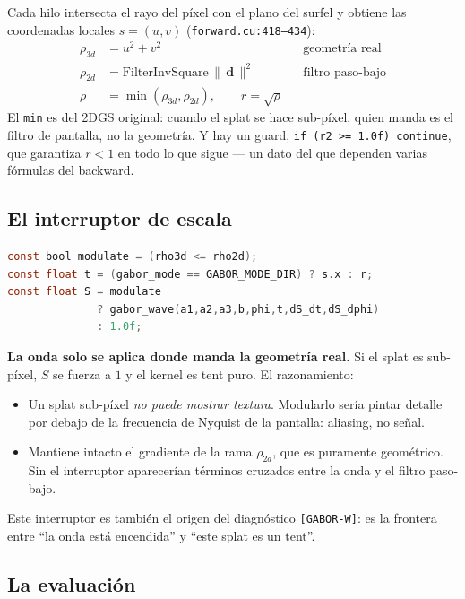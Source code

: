 \documentclass[12pt]{extarticle}
\newcommand{\code}[1]{\texttt{#1}}
\begin{document}
Cada hilo intersecta el rayo del píxel con el plano del surfel y obtiene las
coordenadas locales $s=(u,v)$ (\code{forward.cu:418--434}):
\begin{align}
\rho_{3d} &= u^2+v^2 && \text{geometría real} \\
\rho_{2d} &= \text{FilterInvSquare}\,\|\,\mathbf{d}\,\|^2 && \text{filtro paso-bajo} \\
\rho      &= \min(\rho_{3d},\rho_{2d}), \qquad r=\sqrt{\rho}
\end{align}
El \code{min} es del 2DGS original: cuando el splat se hace sub-píxel, quien
manda es el filtro de pantalla, no la geometría. Y hay un guard,
\code{if (r2 >= 1.0f) continue}, que garantiza $r<1$ en todo lo que sigue ---
un dato del que dependen varias fórmulas del backward.

\subsection{El interruptor de escala}

\begin{lstlisting}[language=C]
const bool modulate = (rho3d <= rho2d);
const float t = (gabor_mode == GABOR_MODE_DIR) ? s.x : r;
const float S = modulate
              ? gabor_wave(a1,a2,a3,b,phi,t,dS_dt,dS_dphi)
              : 1.0f;
\end{lstlisting}

\textbf{La onda solo se aplica donde manda la geometría real.} Si el splat es
sub-píxel, $S$ se fuerza a $1$ y el kernel es tent puro. El razonamiento:

\begin{itemize}
\item Un splat sub-píxel \emph{no puede mostrar textura}. Modularlo sería
      pintar detalle por debajo de la frecuencia de Nyquist de la pantalla:
      aliasing, no señal.
\item Mantiene intacto el gradiente de la rama $\rho_{2d}$, que es puramente
      geométrico. Sin el interruptor aparecerían términos cruzados entre la
      onda y el filtro paso-bajo.
\end{itemize}

Este interruptor es también el origen del diagnóstico \code{[GABOR-W]}: es la
frontera entre ``la onda está encendida'' y ``este splat es un tent''.

\subsection{La evaluación}
\end{document}
